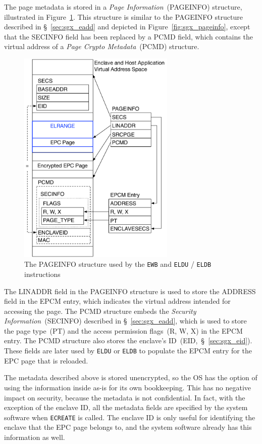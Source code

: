 
The page metadata is stored in a \textit{Page Information}~(PAGEINFO)
structure, illustrated in Figure~\ref{fig:sgx_ewb_pageinfo}. This structure is
similar to the PAGEINFO structure described in \S~\ref{sec:sgx_eadd} and
depicted in Figure~\ref{fig:sgx_pageinfo}, except that the SECINFO field has
been replaced by a PCMD field, which contains the virtual address of a
\textit{Page Crypto Metadata}~(PCMD) structure.

\begin{figure}[hbt]
  \centering
  \includegraphics[width=75mm]{figures/sgx_ewb_pageinfo.pdf}
  \caption{
    The PAGEINFO structure used by the \texttt{EWB} and \texttt{ELDU} /
    \texttt{ELDB} instructions
  }
  \label{fig:sgx_ewb_pageinfo}
\end{figure}

The LINADDR field in the PAGEINFO structure is used to store the ADDRESS field
in the EPCM entry, which indicates the virtual address intended for accessing
the page. The PCMD structure embeds the \textit{Security Information}~(SECINFO)
described in \S~\ref{sec:sgx_eadd}, which is used to store the page type~(PT)
and the access permission flags~(R, W, X) in the EPCM entry. The PCMD structure
also stores the enclave's ID~(EID,~\S~\ref{sec:sgx_eid}). These fields are
later used by \texttt{ELDU} or \texttt{ELDB} to populate the EPCM entry for the
EPC page that is reloaded.

The metadata described above is stored unencrypted, so the OS has the option of
using the information inside as-is for its own bookkeeping. This has no
negative impact on security, because the metadata is not confidential. In fact,
with the exception of the enclave ID, all the metadata fields are specified by
the system software when \texttt{ECREATE} is called. The enclave ID is only
useful for identifying the enclave that the EPC page belongs to, and the system
software already has this information as well.

